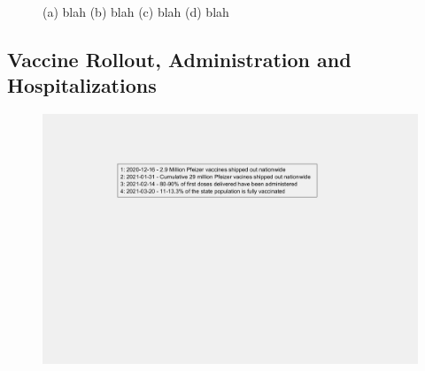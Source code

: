 \documentclass[]{article}
\begin{document}
\begin{figure}
	\caption{(a) blah (b) blah (c) blah (d) blah}
	\label{fig:foobar}
\end{figure}
\FloatBarrier
\vspace{5mm}

\subsection{Vaccine Rollout, Administration and Hospitalizations}

\begin{figure}[!h]
	\includegraphics[width=\linewidth]{legends/vaccine_rollout_legend.png}
	\caption{}
	\label{fig:legends/vaccine_rollout_legendLabel}
\end{figure}
\end{document}
